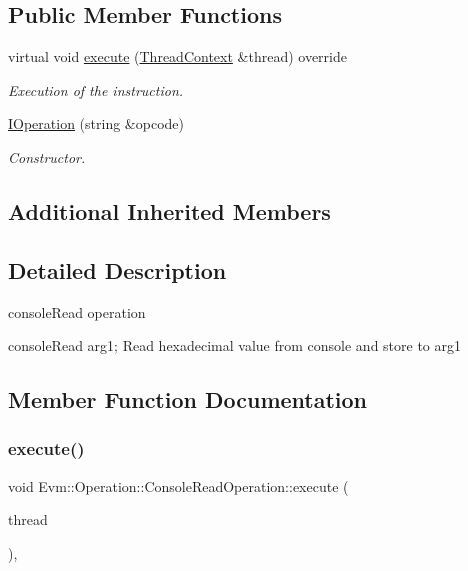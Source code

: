 \subsection*{Public Member Functions}
\begin{DoxyCompactItemize}
\item 
virtual void \mbox{\hyperlink{struct_evm_1_1_operation_1_1_console_read_operation_a7bd7cfc2022abbb7fc9b45a2c75083e0}{execute}} (\mbox{\hyperlink{struct_evm_1_1_thread_context}{Thread\+Context}} \&thread) override
\begin{DoxyCompactList}\small\item\em Execution of the instruction. \end{DoxyCompactList}\item 
\mbox{\hyperlink{struct_evm_1_1_operation_1_1_console_read_operation_a65e98ee1b1679e12c1d1dd000ebfe937}{I\+Operation}} (string \&opcode)
\begin{DoxyCompactList}\small\item\em Constructor. \end{DoxyCompactList}\end{DoxyCompactItemize}
\subsection*{Additional Inherited Members}


\subsection{Detailed Description}
console\+Read operation 

console\+Read arg1; Read hexadecimal value from console and store to arg1 

\subsection{Member Function Documentation}
\mbox{\label{struct_evm_1_1_operation_1_1_console_read_operation_a7bd7cfc2022abbb7fc9b45a2c75083e0}} 
\subsubsection{\texorpdfstring{execute()}{execute()}}
{\footnotesize\ttfamily void Evm\+::\+Operation\+::\+Console\+Read\+Operation\+::execute (\begin{DoxyParamCaption}\item[{\mbox{\hyperlink{struct_evm_1_1_thread_context}{Thread\+Context}} \&}]{thread }\end{DoxyParamCaption})\hspace{0.3cm}{\ttfamily [override]}, {\ttfamily [virtual]}}



